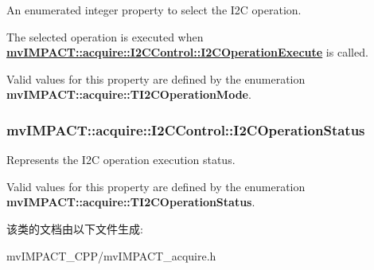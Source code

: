 An enumerated integer property to select the I2\+C operation. 

The selected operation is executed when {\bfseries \hyperlink{classmv_i_m_p_a_c_t_1_1acquire_1_1_i2_c_control_a8da9d7067602fe987ac12cbf3c007d84}{mv\+I\+M\+P\+A\+C\+T\+::acquire\+::\+I2\+C\+Control\+::\+I2\+C\+Operation\+Execute}} is called.

Valid values for this property are defined by the enumeration {\bfseries mv\+I\+M\+P\+A\+C\+T\+::acquire\+::\+T\+I2\+C\+Operation\+Mode}. \hypertarget{classmv_i_m_p_a_c_t_1_1acquire_1_1_i2_c_control_a36782988f085b21b07f05b496af21b80}{
\subsubsection[{I2\+C\+Operation\+Status}]{ mv\+I\+M\+P\+A\+C\+T\+::acquire\+::\+I2\+C\+Control\+::\+I2\+C\+Operation\+Status}}\label{classmv_i_m_p_a_c_t_1_1acquire_1_1_i2_c_control_a36782988f085b21b07f05b496af21b80}


Represents the I2\+C operation execution status. 

Valid values for this property are defined by the enumeration {\bfseries mv\+I\+M\+P\+A\+C\+T\+::acquire\+::\+T\+I2\+C\+Operation\+Status}. 

该类的文档由以下文件生成\+:\begin{DoxyCompactItemize}
\item 
mv\+I\+M\+P\+A\+C\+T\+\_\+\+C\+P\+P/mv\+I\+M\+P\+A\+C\+T\+\_\+acquire.\+h\end{DoxyCompactItemize}
